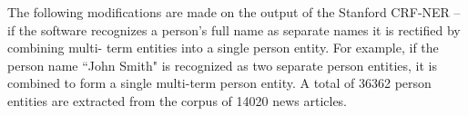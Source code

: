  The following modifications are made on the output of the Stanford CRF-NER -- if the software recognizes a person's full name as separate names it is rectified by combining multi- term entities into a single person entity. For example, if the person name ``John Smith" is recognized as two separate person entities, it is combined to form a single multi-term person entity. A total of 36362 person entities are extracted from the corpus of 14020 news articles.  
